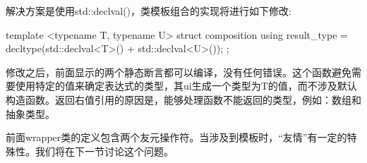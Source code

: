 解决方案是使用std::declval()，类模板组合的实现将进行如下修改:

\begin{cpp}
template <typename T, typename U>
struct composition
{
	using result_type = decltype(std::declval<T>() +
								 std::declval<U>());
};
\end{cpp}

修改之后，前面显示的两个静态断言都可以编译，没有任何错误。这个函数避免需要使用特定的值来确定表达式的类型，其ui生成一个类型为T的值，而不涉及默认构造函数。返回右值引用的原因是，能够处理函数不能返回的类型，例如：数组和抽象类型。

前面wrapper类的定义包含两个友元操作符。当涉及到模板时，“友情”有一定的特殊性。我们将在下一节讨论这个问题。

















